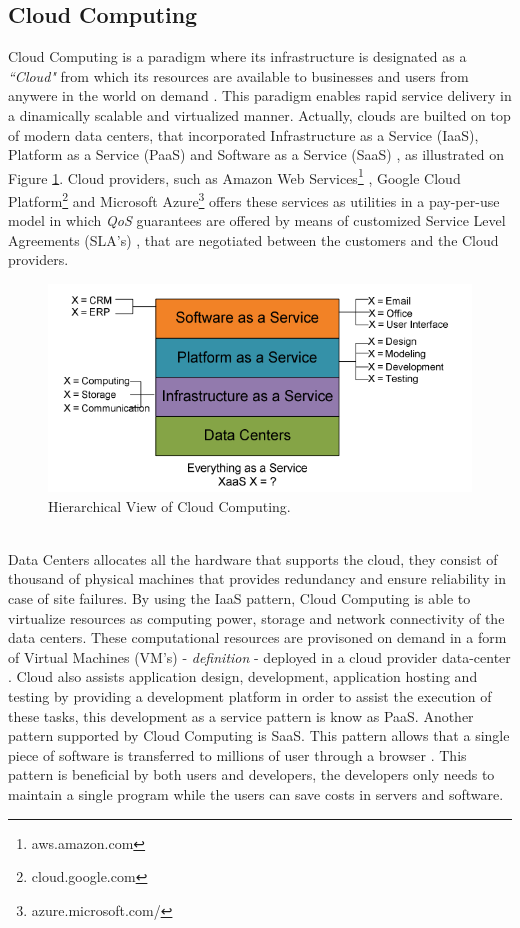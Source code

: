 \subsection{Cloud Computing}
\label{sub:cloud_computing}
Cloud Computing is a paradigm where its infrastructure is designated as a \textit{``Cloud"} from which its resources are available to businesses and users from anywere in the world on demand \cite{buyya2009cloud}.
This paradigm enables rapid service delivery in a dinamically scalable and virtualized manner. Actually, clouds are builted on top of modern data centers, that incorporated Infrastructure as a Service (IaaS),
Platform as a Service (PaaS) and Software as a Service (SaaS) \cite{tsai2010service}, as illustrated on Figure \ref{fig:high_level_cloud_view}. Cloud providers, such as Amazon Web Services\footnote{aws.amazon.com}
, Google Cloud Platform\footnote{cloud.google.com} and Microsoft Azure\footnote{azure.microsoft.com/} offers these services as utilities in a pay-per-use model in which \textit{QoS} guarantees are offered
by means of customized Service Level Agreements (SLA's) \cite{vaquero2008break}, that are negotiated between the customers and the Cloud providers.
\begin{figure}[h!]
  \centering
  \includegraphics[width=.8\textwidth]{./images/high_level_cloud_view}
  \caption{Hierarchical View of Cloud Computing.}
  \label{fig:high_level_cloud_view}
\end{figure}\\
Data Centers allocates all the hardware that supports the cloud, they consist of thousand of physical machines that provides redundancy and ensure reliability in case of site failures. By using the IaaS pattern, Cloud Computing is able to virtualize
resources as computing power, storage and network connectivity of the data centers. These computational resources are provisoned on demand in a form of Virtual Machines (VM's) - \textit{definition} - deployed in a cloud provider data-center \cite{sotomayor2009virtual}.
Cloud also assists application design, development, application hosting and testing by providing a development platform in order to assist the execution of these tasks, this development as a service pattern is know as PaaS. Another pattern supported by Cloud Computing
is SaaS. This pattern allows that a single piece of software is transferred to millions of user through a browser \cite{zhang2010cloud}. This pattern is beneficial by both users and developers, the developers only needs to maintain a single program while the users can
save costs in servers and software.\\

